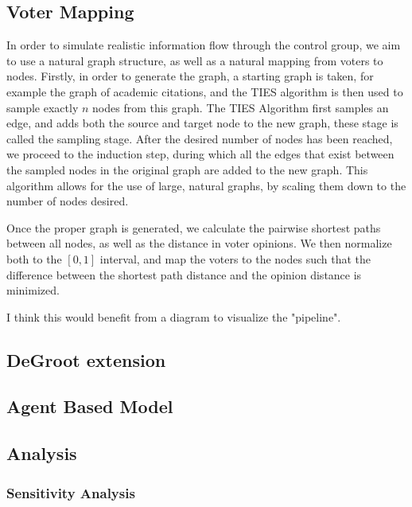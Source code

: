 \subsection{Voter Mapping}
In order to simulate realistic information flow through the control group, we aim to use a natural graph structure, as well as a natural mapping from voters to nodes. Firstly, in order to generate the graph, a starting graph is taken, for example the graph of academic citations, and the TIES \cite{ahmedNetworkSamplingEdgebased} algorithm is then used to sample exactly $n$ nodes from this graph. The TIES Algorithm first samples an edge, and adds both the source and target node to the new graph, these stage is called the sampling stage. After the desired number of nodes has been reached, we proceed to the induction step, during which all the edges that exist between the sampled nodes in the original graph are added to the new graph. This algorithm allows for the use of large, natural graphs, by scaling them down to the number of nodes desired. 

Once the proper graph is generated, we calculate the pairwise shortest paths between all nodes, as well as the distance in voter opinions. We then normalize both to the $[0,1]$ interval, and map the voters to the nodes such that the difference between the shortest path distance and the opinion distance is minimized. 

\textcolor{Bittersweet}{I think this would benefit from a diagram to visualize the "pipeline"}.

\subsection{DeGroot extension}
\subsection{Agent Based Model}
\subsection{Analysis}
\subsubsection{Sensitivity Analysis}

